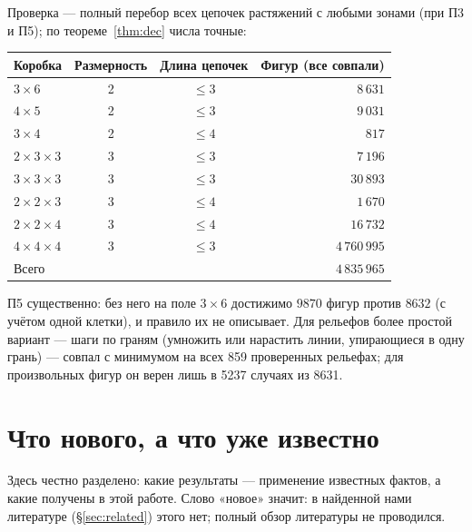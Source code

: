 \documentclass[11pt,a4paper]{article}
\theoremstyle{plain}
\theoremstyle{definition}
\theoremstyle{remark}
\begin{document}
Проверка — полный перебор всех цепочек растяжений с любыми зонами (при П3 и П5); по теореме~\ref{thm:dec} числа точные:

\begin{center}
\begin{tabular}{lccr}
\toprule
Коробка & Размерность & Длина цепочек & Фигур (все совпали)\\
\midrule
$3\times6$ & 2 & $\le3$ & $8\,631$\\
$4\times5$ & 2 & $\le3$ & $9\,031$\\
$3\times4$ & 2 & $\le4$ & $817$\\
$2\times3\times3$ & 3 & $\le3$ & $7\,196$\\
$3\times3\times3$ & 3 & $\le3$ & $30\,893$\\
$2\times2\times3$ & 3 & $\le4$ & $1\,670$\\
$2\times2\times4$ & 3 & $\le4$ & $16\,732$\\
$4\times4\times4$ & 3 & $\le3$ & $4\,760\,995$\\
\midrule
Всего & & & $4\,835\,965$\\
\bottomrule
\end{tabular}
\end{center}

П5 существенно: без него на поле $3\times6$ достижимо $9870$ фигур против $8632$ (с учётом одной клетки), и правило их не описывает. Для рельефов более простой вариант — шаги по граням (умножить или нарастить линии, упирающиеся в одну грань) — совпал с минимумом на всех 859 проверенных рельефах; для произвольных фигур он верен лишь в 5237 случаях из 8631.

\section{Что нового, а что уже известно}\label{sec:new}

Здесь честно разделено: какие результаты — применение известных фактов, а какие получены в этой работе. Слово «новое» значит: в найденной нами литературе (§\ref{sec:related}) этого нет; полный обзор литературы не проводился.
\end{document}
